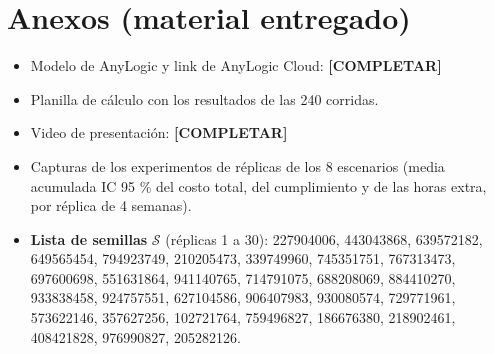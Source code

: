\documentclass[11pt,a4paper]{article}
\newcommand{\pendiente}[1]{\textbf{[#1]}}
\begin{document}
\section*{Anexos (material entregado)}


\begin{itemize}
\item Modelo de AnyLogic y link de AnyLogic Cloud: \pendiente{COMPLETAR}
\item Planilla de cálculo con los resultados de las 240 corridas.
\item Video de presentación: \pendiente{COMPLETAR}
\item Capturas de los experimentos de réplicas de los 8 escenarios (media acumulada \textpm{} IC 95 \% del costo total, del cumplimiento y de las horas extra, por réplica de 4 semanas).
\item \textbf{Lista de semillas} $\mathcal{S}$ (réplicas 1 a 30): 227904006, 443043868, 639572182, 649565454, 794923749, 210205473, 339749960, 745351751, 767313473, 697600698, 551631864, 941140765, 714791075, 688208069, 884410270, 933838458, 924757551, 627104586, 906407983, 930080574, 729771961, 573622146, 357627256, 102721764, 759496827, 186676380, 218902461, 408421828, 976990827, 205282126.
\end{itemize}
\end{document}
